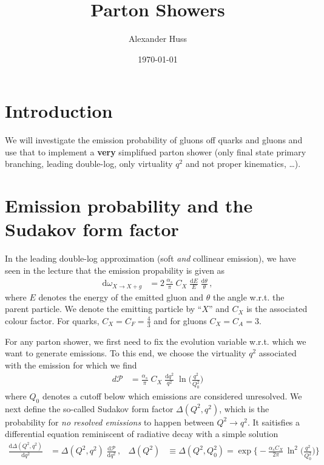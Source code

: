 \documentclass[11pt]{article}
\author{Alexander Huss}
\date{\today}
\title{Parton Showers}
\begin{document}
\maketitle
\tableofcontents



\section{Introduction}
\label{sec:org85d9fdd}
We will investigate the emission probability of gluons off quarks and gluons and use that to implement a \textbf{very} simplifued parton shower (only final state primary branching, leading double-log, only virtuality \(q^2\) and not proper kinematics, \ldots{}).

\section{Emission probability and the Sudakov form factor}
\label{sec:orga58c098}
In the leading double-log approximation (soft \emph{and} collinear emission), we have seen in the lecture that the emission propability is given as
\begin{align}
  \mathrm{d}\omega_{X\to X+g}
  &=
  2 \, \frac{\alpha_s}{\pi}\; C_X \; \frac{\mathrm{d}E}{E} \; \frac{\mathrm{d}\theta}{\theta}
  \,,
\end{align}
where \(E\) denotes the energy of the emitted gluon and \(\theta\) the angle w.r.t. the parent particle.
We denote the emitting particle by ``\(X\)'' and \(C_X\) is the associated colour factor.
For quarks, \(C_X=C_F=\tfrac{4}{3}\) and for gluons \(C_X=C_A=3\).

For any parton shower, we first need to fix the evolution variable w.r.t. which we want to generate emissions.
To this end, we choose the virtuality \(q^2\) associated with the emission for which we find
\begin{align}
  d\mathcal{P}
  &=
  \frac{\alpha_s}{\pi}\; C_X \; \frac{\mathrm{d}q^2}{q^2} \; \ln\biggl(\frac{q^2}{Q_0^2}\biggr)
\end{align}
where \(Q_0\) denotes a cutoff below which emissions are considered unresolved.
We next define the so-called Sudakov form factor \(\Delta(Q^2,q^2)\), which is the probability for \emph{no resolved emissions} to happen between \(Q^2 \to q^2\).
It saitisfies a differential equation reminiscent of radiative decay with a simple solution
\begin{align}
  \frac{\mathrm{d}\Delta(Q^2,q^2)}{\mathrm{d}q^2}
  &=
  \Delta(Q^2,q^2) \; \frac{\mathrm{d}\mathcal{P}}{\mathrm{d}q^2}
  \,,&
  \Delta(Q^2)
  &\equiv \Delta(Q^2,Q_0^2)
  =
  \exp\biggl\{-\frac{\alpha_s C_X}{2\pi} \, \ln^2\biggl(\frac{q^2}{Q_0^2}\biggr) \biggr\}
\end{align}
\end{document}
